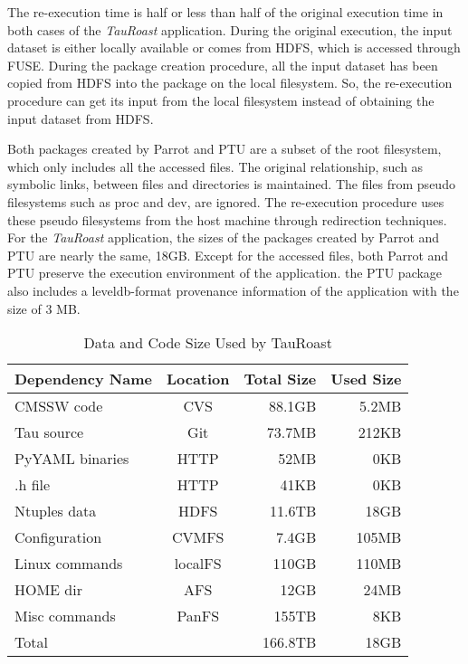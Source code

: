 The re-execution time is half or less than half of the original execution time in both cases of the \emph{TauRoast} application. During the original execution, the input dataset is either locally available or comes from HDFS, which is accessed through FUSE. During the package creation procedure, all the input dataset has been copied from HDFS into the package on the local filesystem. So, the re-execution procedure can get its input from the local filesystem instead of obtaining the input dataset from HDFS.

Both packages created by Parrot and PTU are a subset of the root filesystem, which only includes all the accessed files. The original relationship, such as symbolic links, between files and directories is maintained. The files from pseudo filesystems such as proc and dev, are ignored. The re-execution procedure uses these pseudo filesystems from the host machine through redirection techniques.
For the \emph{TauRoast} application, the sizes of the packages created by Parrot and PTU are nearly the same, 18GB. 
Except for the accessed files, both Parrot and PTU preserve the execution environment of the application. 
the PTU package also includes a leveldb-format provenance information of the application with the size of 3 MB.

\begin{table}
\small
	\centering
	    \begin{tabular}{lcrr}
	        \hline
	        \bf Dependency Name & \bf Location & \bf Total Size &  \bf Used Size\\ 
	        \hline
	        CMSSW code     & CVS & 88.1GB &  5.2MB\\ \hline
	        Tau source       & Git & 73.7MB & 212KB \\ \hline
	        PyYAML binaries    & HTTP & 52MB& 0KB \\ \hline
	        .h file       & HTTP& 41KB & 0KB \\ \hline 
	        Ntuples data    & HDFS& 11.6TB & 18GB \\ \hline
	        Configuration & CVMFS & 7.4GB & 105MB \\ \hline
	        Linux commands & localFS & 110GB & 110MB \\ \hline     
	        HOME dir& AFS &12GB & 24MB\\ \hline
	        Misc commands & PanFS & 155TB & 8KB \\ \hline
	        Total      &    & 166.8TB     &  18GB \\ \hline
	    \end{tabular}
	    \normalsize
	    \caption{Data and Code Size Used by TauRoast}
	    \label{table:size-original-real}
\end{table}
	   
